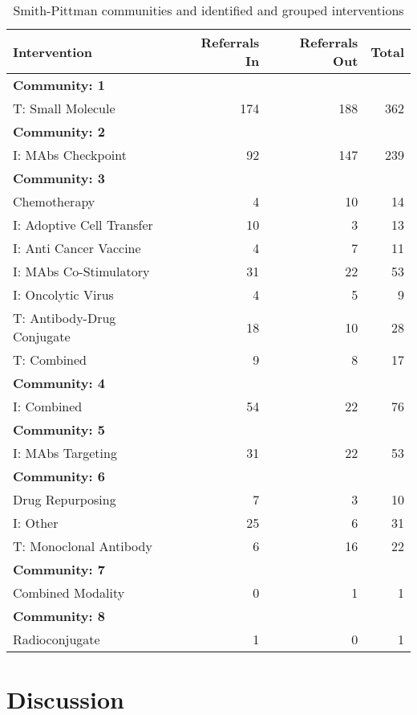 \documentclass{article}
\begin{document}
\begin{table}[htbp]
\centering
\begin{tabular}{lrrr}
\toprule
Intervention & Referrals In & Referrals Out & Total \\ 
\midrule
\multicolumn{4}{l}{\textbf{Community: 1}} \\ 
\midrule
T: Small Molecule & 174 & 188 & 362 \\ 
\midrule
\multicolumn{4}{l}{\textbf{Community: 2}} \\ 
\midrule
I: MAbs Checkpoint & 92 & 147 & 239 \\ 
\midrule
\multicolumn{4}{l}{\textbf{Community: 3}} \\ 
\midrule
Chemotherapy & 4 & 10 & 14 \\ 
I: Adoptive Cell Transfer & 10 & 3 & 13 \\ 
I: Anti Cancer Vaccine & 4 & 7 & 11 \\ 
I: MAbs Co-Stimulatory & 31 & 22 & 53 \\ 
I: Oncolytic Virus & 4 & 5 & 9 \\ 
T: Antibody-Drug Conjugate & 18 & 10 & 28 \\ 
T: Combined & 9 & 8 & 17 \\ 
\midrule
\multicolumn{4}{l}{\textbf{Community: 4}} \\ 
\midrule
I: Combined & 54 & 22 & 76 \\ 
\midrule
\multicolumn{4}{l}{\textbf{Community: 5}} \\ 
\midrule
I: MAbs Targeting & 31 & 22 & 53 \\ 
\midrule
\multicolumn{4}{l}{\textbf{Community: 6}} \\ 
\midrule
Drug Repurposing & 7 & 3 & 10 \\ 
I: Other & 25 & 6 & 31 \\ 
T: Monoclonal Antibody & 6 & 16 & 22 \\ 
\midrule
\multicolumn{4}{l}{\textbf{Community: 7}} \\ 
\midrule
Combined Modality & 0 & 1 & 1 \\ 
\midrule
\multicolumn{4}{l}{\textbf{Community: 8}} \\ 
\midrule
Radioconjugate & 1 & 0 & 1 \\ 
\bottomrule
\end{tabular}
\caption{Smith-Pittman communities and identified and grouped interventions}
\end{table}

\section{Discussion}\label{discussion}
\end{document}
